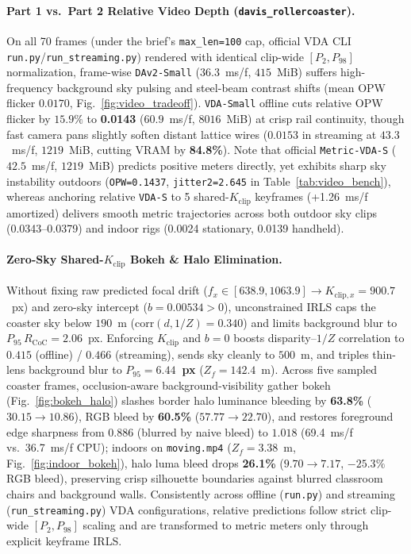 \documentclass[10pt,twocolumn,letterpaper]{article}
\begin{document}
\paragraph{Part 1 vs.\ Part 2 Relative Video Depth (\texttt{davis\_rollercoaster}).}
On all 70 frames (under the brief's \texttt{max\_len=100} cap, official VDA CLI \texttt{run.py}/\texttt{run\_streaming.py}) rendered with identical clip-wide $[P_2, P_{98}]$ normalization, frame-wise \texttt{DAv2-Small} ($36.3$~ms/f, $415$~MiB) suffers high-frequency background sky pulsing and steel-beam contrast shifts (mean OPW flicker $0.0170$, Fig.~\ref{fig:video_tradeoff}). \texttt{VDA-Small} offline cuts relative OPW flicker by $15.9\%$ to \textbf{0.0143} ($60.9$~ms/f, $8016$~MiB) at crisp rail continuity, though fast camera pans slightly soften distant lattice wires ($0.0153$ in streaming at $43.3$~ms/f, $1219$~MiB, cutting VRAM by \textbf{84.8\%}). Note that official \texttt{Metric-VDA-S} ($42.5$~ms/f, $1219$~MiB) predicts positive meters directly, yet exhibits sharp sky instability outdoors (\texttt{OPW=0.1437}, \texttt{jitter2=2.645} in Table~\ref{tab:video_bench}), whereas anchoring relative \texttt{VDA-S} to 5 shared-$K_{\text{clip}}$ keyframes (+1.26~ms/f amortized) delivers smooth metric trajectories across both outdoor sky clips (0.0343--0.0379) and indoor rigs (0.0024 stationary, 0.0139 handheld).

\vspace{-0.2em}
\paragraph{Zero-Sky Shared-$K_{\mathrm{clip}}$ Bokeh \& Halo Elimination.}
Without fixing raw predicted focal drift ($f_x\in [638.9, 1063.9]\to K_{\mathrm{clip},x}=900.7$~px) and zero-sky intercept ($b=0.00534>0$), unconstrained IRLS caps the coaster sky below $190$~m ($\mathrm{corr}(d, 1/Z)=0.340$) and limits background blur to $P_{95}\,R_{\mathrm{CoC}}=2.06$~px. Enforcing $K_{\mathrm{clip}}$ and $b=0$ boosts disparity--$1/Z$ correlation to $0.415$ (offline) / $0.466$ (streaming), sends sky cleanly to $500$~m, and triples thin-lens background blur to \textbf{$P_{95}=6.44$~px} ($Z_f=142.4$~m). Across five sampled coaster frames, occlusion-aware background-visibility gather bokeh (Fig.~\ref{fig:bokeh_halo}) slashes border halo luminance bleeding by \textbf{63.8\%} ($30.15\to 10.86$), RGB bleed by \textbf{60.5\%} ($57.77\to 22.70$), and restores foreground edge sharpness from $0.886$ (blurred by naive bleed) to $1.018$ (69.4~ms/f vs.\ 36.7~ms/f CPU); indoors on \texttt{moving.mp4} ($Z_f=3.38$~m, Fig.~\ref{fig:indoor_bokeh}), halo luma bleed drops \textbf{26.1\%} ($9.70\to 7.17$, $-25.3\%$ RGB bleed), preserving crisp silhouette boundaries against blurred classroom chairs and background walls. Consistently across offline (\texttt{run.py}) and streaming (\texttt{run\_streaming.py}) VDA configurations, relative predictions follow strict clip-wide $[P_2, P_{98}]$ scaling and are transformed to metric meters only through explicit keyframe IRLS.
\end{document}
